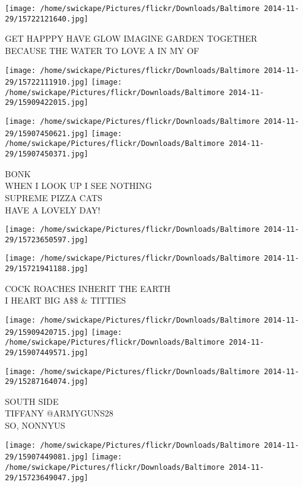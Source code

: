 \documentclass[10pt,letterpaper]{article}
\begin{document}
\vspace{0.25in}
\texttt{[image: /home/swickape/Pictures/flickr/Downloads/Baltimore 2014-11-29/15722121640.jpg]}

GET HAPPPY HAVE GLOW IMAGINE GARDEN TOGETHER\\
BECAUSE THE WATER TO LOVE A IN MY OF
\pagebreak

\texttt{[image: /home/swickape/Pictures/flickr/Downloads/Baltimore 2014-11-29/15722111910.jpg]}
\texttt{[image: /home/swickape/Pictures/flickr/Downloads/Baltimore 2014-11-29/15909422015.jpg]}

\texttt{[image: /home/swickape/Pictures/flickr/Downloads/Baltimore 2014-11-29/15907450621.jpg]}
\texttt{[image: /home/swickape/Pictures/flickr/Downloads/Baltimore 2014-11-29/15907450371.jpg]}

BONK\\
WHEN I LOOK UP I SEE NOTHING\\
SUPREME PIZZA CATS\\
HAVE A LOVELY DAY!
\pagebreak

\texttt{[image: /home/swickape/Pictures/flickr/Downloads/Baltimore 2014-11-29/15723650597.jpg]}

\vspace{0.25in}
\texttt{[image: /home/swickape/Pictures/flickr/Downloads/Baltimore 2014-11-29/15721941188.jpg]}

COCK ROACHES INHERIT THE EARTH\\
I HEART BIG A\$\$ \& TITTIES
\pagebreak

\texttt{[image: /home/swickape/Pictures/flickr/Downloads/Baltimore 2014-11-29/15909420715.jpg]}
\texttt{[image: /home/swickape/Pictures/flickr/Downloads/Baltimore 2014-11-29/15907449571.jpg]}

\vspace{0.25in}
\texttt{[image: /home/swickape/Pictures/flickr/Downloads/Baltimore 2014-11-29/15287164074.jpg]}

SOUTH SIDE\\
TIFFANY @ARMYGUNS28\\
SO, NONNYUS
\pagebreak

\texttt{[image: /home/swickape/Pictures/flickr/Downloads/Baltimore 2014-11-29/15907449081.jpg]}
\texttt{[image: /home/swickape/Pictures/flickr/Downloads/Baltimore 2014-11-29/15723649047.jpg]}
\end{document}
